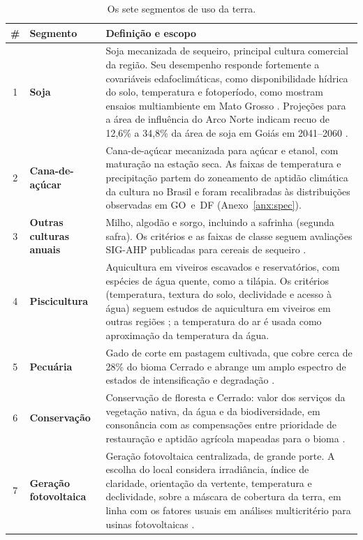 \begin{table}[htbp]
\centering
\caption{Os sete segmentos de uso da terra.}\label{tab:segments}
\begin{tabular}{@{}cl>{\raggedright\arraybackslash}p{9.5cm}@{}}
\toprule
\# & Segmento & Definição e escopo \\
\midrule
1 & \textbf{Soja} & Soja mecanizada de sequeiro, principal cultura comercial da região. Seu desempenho
  responde fortemente a covariáveis edafoclimáticas, como disponibilidade hídrica do solo, temperatura
  e fotoperíodo, como mostram ensaios multiambiente em Mato Grosso
  \citep[pp.~1--3]{corbellini_geographical_2024}. Projeções para a área de influência do Arco Norte
  indicam recuo de 12,6\% a 34,8\% da área de soja em Goiás em 2041--2060
  \citep[p.~11]{souza_climate-driven_2026}. \\
2 & \textbf{Cana-de-açúcar} & Cana-de-açúcar mecanizada para açúcar e etanol, com maturação na estação
  seca. As faixas de temperatura e precipitação partem do zoneamento de aptidão climática da cultura no
  Brasil \citep[p.~782]{aparecido_climate_2021} e foram recalibradas às distribuições observadas em
  GO~e~DF (Anexo~\ref{anx:spec}). \\
3 & \textbf{Outras culturas anuais} & Milho, algodão e sorgo, incluindo a safrinha (segunda safra).
  Os critérios e as faixas de classe seguem avaliações SIG-AHP publicadas para cereais de sequeiro
  \citep[pp.~6--8]{tadesse_land_2020}. \\
4 & \textbf{Piscicultura} & Aquicultura em viveiros escavados e reservatórios, com espécies de água quente,
  como a tilápia. Os critérios (temperatura, textura do solo, declividade e acesso à água) seguem estudos
  de aquicultura em viveiros em outras regiões
  \parencites{ssegane_geospatial_2012}[Tabela~1]{assefa_gis_2018}; a temperatura do ar é usada como
  aproximação da temperatura da água. \\
5 & \textbf{Pecuária} & Gado de corte em pastagem cultivada, que cobre cerca de 28\% do bioma Cerrado e
  abrange um amplo espectro de estados de intensificação e degradação
  \parencites[p.~1219]{vieira_classification_2022}{molossi_improve_2020}. \\
6 & \textbf{Conservação} & Conservação de floresta e Cerrado: valor dos serviços da vegetação nativa,
  da água e da biodiversidade, em consonância com as compensações entre prioridade de restauração e
  aptidão agrícola mapeadas para o bioma \citep{schuler_spatial_2022}. \\
7 & \textbf{Geração fotovoltaica} & Geração fotovoltaica centralizada, de grande porte. A escolha do local
  considera irradiância, índice de claridade, orientação da vertente, temperatura e declividade, sobre a
  máscara de cobertura da terra, em linha com os fatores usuais em análises multicritério para usinas
  fotovoltaicas \citep[Tabela~2]{rane_gis-based_2024}. \\
\bottomrule
\end{tabular}
\end{table}

